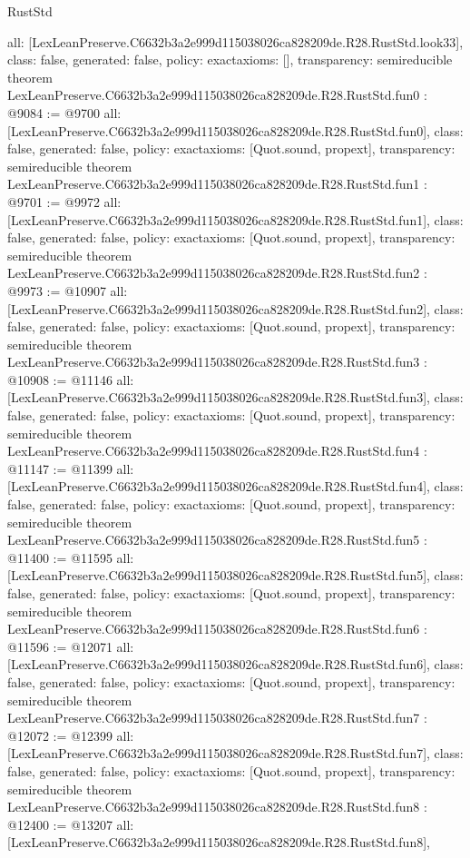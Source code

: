 \begin{lexlean}{RustStd}
\begin{coremodule}
{  all: [LexLeanPreserve.C6632b3a2e999d115038026ca828209de.R28.RustStd.look33],
  class: false,
  generated: false,
  policy: exact{axioms: []},
  transparency: semireducible
}
theorem LexLeanPreserve.C6632b3a2e999d115038026ca828209de.R28.RustStd.fun0 : @9084 := @9700 {
  all: [LexLeanPreserve.C6632b3a2e999d115038026ca828209de.R28.RustStd.fun0],
  class: false,
  generated: false,
  policy: exact{axioms: [Quot.sound, propext]},
  transparency: semireducible
}
theorem LexLeanPreserve.C6632b3a2e999d115038026ca828209de.R28.RustStd.fun1 : @9701 := @9972 {
  all: [LexLeanPreserve.C6632b3a2e999d115038026ca828209de.R28.RustStd.fun1],
  class: false,
  generated: false,
  policy: exact{axioms: [Quot.sound, propext]},
  transparency: semireducible
}
theorem LexLeanPreserve.C6632b3a2e999d115038026ca828209de.R28.RustStd.fun2 : @9973 := @10907 {
  all: [LexLeanPreserve.C6632b3a2e999d115038026ca828209de.R28.RustStd.fun2],
  class: false,
  generated: false,
  policy: exact{axioms: [Quot.sound, propext]},
  transparency: semireducible
}
theorem LexLeanPreserve.C6632b3a2e999d115038026ca828209de.R28.RustStd.fun3 : @10908 := @11146 {
  all: [LexLeanPreserve.C6632b3a2e999d115038026ca828209de.R28.RustStd.fun3],
  class: false,
  generated: false,
  policy: exact{axioms: [Quot.sound, propext]},
  transparency: semireducible
}
theorem LexLeanPreserve.C6632b3a2e999d115038026ca828209de.R28.RustStd.fun4 : @11147 := @11399 {
  all: [LexLeanPreserve.C6632b3a2e999d115038026ca828209de.R28.RustStd.fun4],
  class: false,
  generated: false,
  policy: exact{axioms: [Quot.sound, propext]},
  transparency: semireducible
}
theorem LexLeanPreserve.C6632b3a2e999d115038026ca828209de.R28.RustStd.fun5 : @11400 := @11595 {
  all: [LexLeanPreserve.C6632b3a2e999d115038026ca828209de.R28.RustStd.fun5],
  class: false,
  generated: false,
  policy: exact{axioms: [Quot.sound, propext]},
  transparency: semireducible
}
theorem LexLeanPreserve.C6632b3a2e999d115038026ca828209de.R28.RustStd.fun6 : @11596 := @12071 {
  all: [LexLeanPreserve.C6632b3a2e999d115038026ca828209de.R28.RustStd.fun6],
  class: false,
  generated: false,
  policy: exact{axioms: [Quot.sound, propext]},
  transparency: semireducible
}
theorem LexLeanPreserve.C6632b3a2e999d115038026ca828209de.R28.RustStd.fun7 : @12072 := @12399 {
  all: [LexLeanPreserve.C6632b3a2e999d115038026ca828209de.R28.RustStd.fun7],
  class: false,
  generated: false,
  policy: exact{axioms: [Quot.sound, propext]},
  transparency: semireducible
}
theorem LexLeanPreserve.C6632b3a2e999d115038026ca828209de.R28.RustStd.fun8 : @12400 := @13207 {
  all: [LexLeanPreserve.C6632b3a2e999d115038026ca828209de.R28.RustStd.fun8],
}
\end{coremodule}
\end{lexlean}
